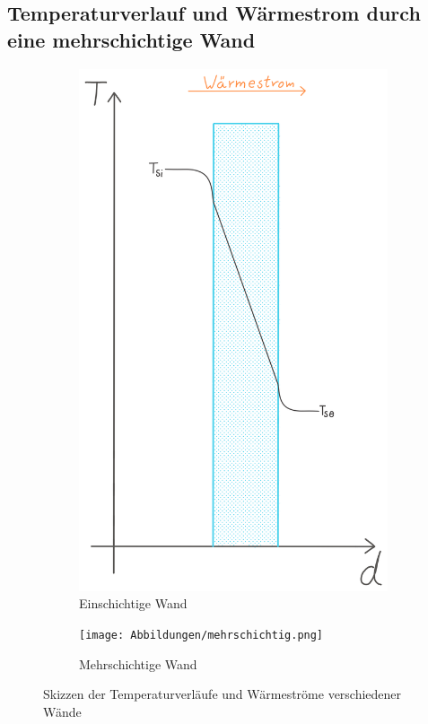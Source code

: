 \subsection{Temperaturverlauf und Wärmestrom durch eine mehrschichtige Wand}
\begin{figure}[H]
	\centering
	\begin{subfigure}[c]{0.303\textwidth}
		\includegraphics[width=\textwidth]{Abbildungen/einschichtig.png}
		\caption{Einschichtige Wand}
	\end{subfigure}
	\begin{subfigure}[c]{0.497\textwidth}
		\texttt{[image: Abbildungen/mehrschichtig.png]}
		\caption{Mehrschichtige Wand}
	\end{subfigure}
	\caption{Skizzen der Temperaturverläufe und Wärmeströme verschiedener Wände}
	\label{fig:230515_Temp-verlauf}
\end{figure}

